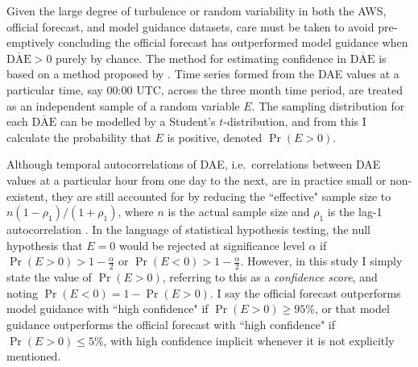 \documentclass{ametsoc}
\DeclareMathOperator{\pr}{Pr}
\begin{document}
Given the large degree of turbulence or random variability in both the AWS, official forecast, and model guidance datasets, care must be taken to avoid pre-emptively concluding the official forecast has outperformed model guidance when $\overline{\text{DAE}}>0$ purely by chance. The method for estimating confidence in $\overline{\text{DAE}}$ is based on a method proposed by \citet{griffiths17}. Time series formed from the DAE values at a particular time, say 00:00 UTC, across the three month time period, are treated as an independent sample of a random variable $E$. The sampling distribution for each $\overline{\text{DAE}}$ can be modelled by a Student's $t$-distribution, and from this I calculate the probability that $E$ is positive, denoted $\pr\left(E > 0\right)$. 

Although temporal autocorrelations of DAE, i.e.~correlations between DAE values at a particular hour from one day to the next, are in practice small or non-existent, they are still accounted for by reducing the ``effective" sample size to $ n \left(1-\rho_1\right)/\left(1+\rho_1\right)$, where $n$ is the actual sample size and $\rho_1$ is the lag-1 autocorrelation \citep{zwiers95,wilks11}. In the language of statistical hypothesis testing, the null hypothesis that $E=0$ would be rejected at significance level $\alpha$ if $\pr(E>0) > 1-\frac{\alpha}{2}$ or $\pr(E<0) > 1-\frac{\alpha}{2}$. However, in this study I simply state the value of $\pr(E>0)$, referring to this as a \textit{confidence score}, and noting $\pr(E<0) = 1- \pr(E>0)$. I say the official forecast outperforms model guidance with ``high confidence" if $\pr(E>0) \geq 95\%$, or that model guidance outperforms the  official forecast with ``high confidence" if $\pr(E>0) \leq 5\%$, with high confidence implicit whenever it is not explicitly mentioned.
\end{document}
